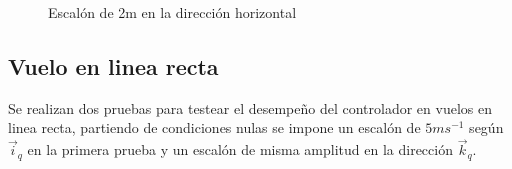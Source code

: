 \documentclass[main]{subfiles}
\begin{document}
\begin{figure}
  \centering
 
  \caption{Escal\'on de 2m en la direcci\'on horizontal}
  \label{fig:hov_esc_x}
\end{figure}

\subsection{Vuelo en linea recta}
Se realizan dos pruebas para testear el desempeño del controlador en vuelos en linea recta, partiendo de condiciones nulas se impone un escal\'on de $5m s ^{-1}$ seg\'un $\vec{i}_q$ en la primera prueba y un escal\'on de misma amplitud en la direcci\'on $\vec{k}_q$.
\end{document}
